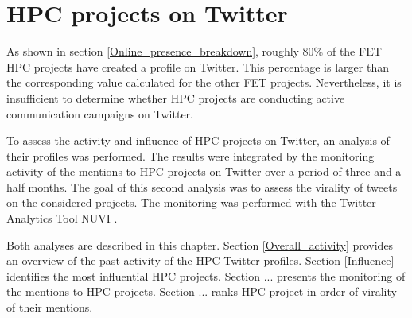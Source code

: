 \chapter{HPC projects on Twitter} \label{HPC_projects_on_Twitter}
As shown in section \ref{Online_presence_breakdown}, roughly 80\% of the FET HPC projects have created a profile on Twitter. This percentage is larger than the corresponding value calculated for the other FET projects. Nevertheless, it is insufficient to determine whether HPC projects are conducting active communication campaigns on Twitter. 

To assess the activity and influence of HPC projects on Twitter, an analysis of their profiles was performed. The results were integrated by the monitoring activity of the mentions to HPC projects on Twitter over a period of three and a half months. The goal of this second analysis was to assess the virality of tweets on the considered projects. The monitoring was performed with the Twitter Analytics Tool NUVI \cite{NUVI}. 

Both analyses are described in this chapter. Section \ref{Overall_activity} provides an overview of the past activity of the HPC Twitter profiles. Section \ref{Influence} identifies the most influential HPC projects. Section ... presents the monitoring of the mentions to HPC projects. Section ... ranks HPC project in order of virality of their mentions. 

